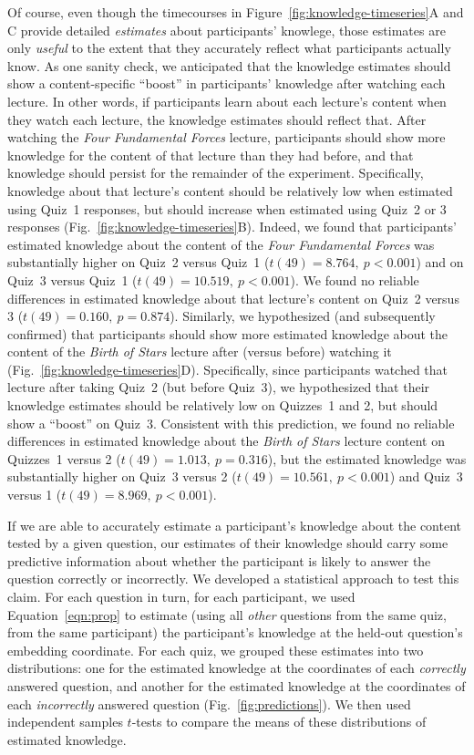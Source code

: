 \documentclass[10pt]{article}
\begin{document}
Of course, even though the timecourses in
Figure~\ref{fig:knowledge-timeseries}A and C provide detailed
\textit{estimates} about participants' knowlege, those estimates are only
\textit{useful} to the extent that they accurately reflect what participants
actually know. As one sanity check, we anticipated that the knowledge estimates
should show a content-specific ``boost'' in participants' knowledge after
watching each lecture. In other words, if participants learn about each
lecture's content when they watch each lecture, the knowledge estimates should
reflect that. After watching the \textit{Four Fundamental Forces} lecture,
participants should show more knowledge for the content of that lecture than
they had before, and that knowledge should persist for the remainder of the
experiment. Specifically, knowledge about that lecture's content should be
relatively low when estimated using Quiz~1 responses, but should increase when
estimated using Quiz~2 or 3 responses (Fig.~\ref{fig:knowledge-timeseries}B).
Indeed, we found that participants' estimated knowledge about the content of
the \textit{Four Fundamental Forces} was substantially higher on Quiz~2 versus
Quiz~1 ($t(49) = 8.764,~p < 0.001$) and on Quiz~3 versus Quiz~1 ($t(49) =
10.519,~p < 0.001$). We found no reliable differences in estimated knowledge
about that lecture's content on Quiz~2 versus 3 ($t(49) = 0.160,~p = 0.874$).
Similarly, we hypothesized (and subsequently confirmed) that participants
should show more estimated knowledge about the content of the \textit{Birth of
Stars} lecture after (versus before) watching it
(Fig.~\ref{fig:knowledge-timeseries}D). Specifically, since participants
watched that lecture after taking Quiz~2 (but before Quiz~3), we hypothesized
that their knowledge estimates should be relatively low on Quizzes~1 and 2, but
should show a ``boost'' on Quiz~3. Consistent with this prediction, we found no
reliable differences in estimated knowledge about the \textit{Birth of Stars}
lecture content on Quizzes~1 versus 2 ($t(49) = 1.013,~p = 0.316$), but the
estimated knowledge was substantially higher on Quiz~3 versus 2 ($t(49) =
10.561,~p < 0.001$) and Quiz~3 versus 1 ($t(49) = 8.969,~p < 0.001$).

If we are able to accurately estimate a participant's knowledge about the
content tested by a given question, our estimates of their knowledge should carry some
predictive information about whether the participant is likely to answer the
question correctly or incorrectly. We developed a statistical approach to test this claim. 
For each question in turn, for each
participant, we used Equation~\ref{eqn:prop} to estimate (using all
\textit{other} questions from the same quiz, from the same participant) the
participant's knowledge at the held-out question's embedding coordinate. For
each quiz, we grouped these estimates into two distributions: one for the
estimated knowledge at the coordinates of each \textit{correctly} answered
question, and another for the estimated knowledge at the coordinates of each
\textit{incorrectly} answered question (Fig.~\ref{fig:predictions}). We then
used independent samples $t$-tests to compare the means of these distributions
of estimated knowledge.
\end{document}
